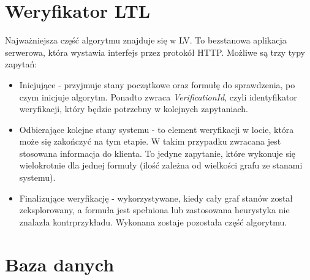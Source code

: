 \newpage

\section{Weryfikator LTL}

Najważniejsza część algorytmu znajduje się w LV.
To bezstanowa aplikacja serwerowa, która wystawia interfejs przez protokół HTTP.
Możliwe są trzy typy zapytań:
\begin{itemize}
\item Inicjujące - przyjmuje stany początkowe oraz formułę do sprawdzenia, po czym inicjuje algorytm. Ponadto zwraca \textit{VerificationId}, czyli identyfikator weryfikacji, który będzie potrzebny w kolejnych zapytaniach.
\item Odbierające kolejne stany systemu - to element weryfikacji w locie, która może się zakończyć na tym etapie. W takim przypadku zwracana jest stosowana informacja do klienta. To jedyne zapytanie, które wykonuje się wielokrotnie dla jednej formuły (ilość zależna od wielkości grafu ze stanami systemu).
\item Finalizujące weryfikację - wykorzystywane, kiedy cały graf stanów został zeksplorowany, a formuła jest spełniona lub zastosowana heurystyka nie znalazła kontrprzykładu. Wykonana zostaje pozostała część algorytmu.
\end{itemize}





\section{Baza danych}





